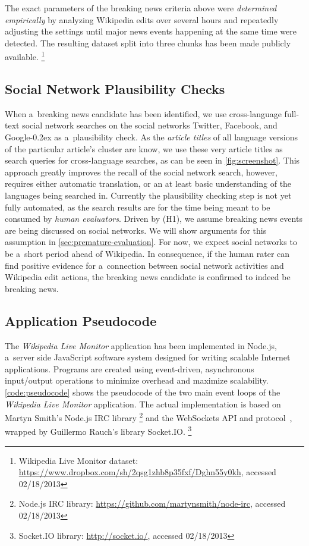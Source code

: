 \documentclass{www13-companion-accepted}
\DeclareRobustCommand{\googleplus}{\mbox{Google\hspace{0em}\raisebox{.28ex}{\tiny\bf +}\kern-0.2ex}\xspace}
\newcommand{\inlinelistingsize}{\fontsize{8pt}{11pt}}
\let\oldurl\url
\renewcommand{\url}[1]{\inlinelistingsize\oldurl{#1}}
\begin{document}
The exact parameters of the breaking news criteria above
were \emph{determined empirically} by analyzing Wikipedia edits
over several hours and repeatedly adjusting the settings until
major news events happening at the same time were detected.
The resulting dataset split into three chunks has been made publicly available.%
\footnote{Wikipedia Live Monitor dataset: \url{https://www.dropbox.com/sh/2qsg1zhb8p35fxf/Dghn55y0kh},
accessed 02/18/2013}

\subsection{Social Network Plausibility Checks}

When a~breaking news candidate has been identified,
we use cross-language full-text social network searches 
on the social networks Twitter, Facebook, and \googleplus
as a~plausibility check.
As the \emph{article titles} of all language versions
of the particular article's cluster are know,
we use these very article titles as search queries for cross-language searches,
as can be seen in \autoref{fig:screenshot}.
This approach greatly improves the recall of the social network search,
however, requires either automatic translation, or an at least basic understanding
of the languages being searched in.
Currently the plausibility checking step is not yet fully automated,
as the search results are for the time being meant to be consumed by \emph{human evaluators}.
Driven by (H1), we assume breaking news events are being discussed on social networks.
We will show arguments for this assumption in \autoref{sec:premature-evaluation}.
For now, we expect social networks to be a~short period ahead of Wikipedia.
In consequence, if the human rater can find positive evidence
for a~connection between social network activities and Wikipedia edit actions,
the breaking news candidate is confirmed to indeed be breaking news.

\subsection{Application Pseudocode}

The \emph{Wikipedia Live Monitor} application has been implemented in Node.js,
a~server side JavaScript software system
designed for writing scalable Internet applications.
Programs are created using event-driven, asynchronous input/output operations
to minimize overhead and maximize scalability.
\autoref{code:pseudocode} shows the pseudocode of the two main event loops of the
\emph{Wikipedia Live Monitor} application.
The actual implementation is based on 
Martyn Smith's Node.js IRC library%
\footnote{Node.js IRC library: \url{https://github.com/martynsmith/node-irc},
accessed 02/18/2013} and
the WebSockets API and protocol~\cite{hickson2012websockets},
wrapped by  Guillermo Rauch's library Socket.IO.%
\footnote{Socket.IO library: \url{http://socket.io/},
accessed 02/18/2013}
\end{document}
